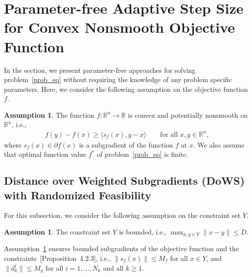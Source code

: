\documentclass{article}
\def\la{\langle}
\def\ra{\rangle}
\def\R{\mathbb{R}}
\theoremstyle{plain}
\theoremstyle{definition}
\newtheorem{assumption}[theorem]{Assumption}
\theoremstyle{remark}
\begin{document}

\section{Parameter-free Adaptive Step Size for Convex Nonsmooth Objective Function}\label{sec:adaptive_step}

In the section, we present parameter-free approaches for solving problem~\eqref{prob_eq} without requiring the knowledge of any problem specific parameters. Here, we consider the following assumption on the objective function $f$.
%
%
\begin{assumption}\label{asum_convex}
    The function $f:\R^n \rightarrow \R$ is convex and potentially nonsmooth on $\R^n$, i.e., 
    \begin{align*}
        f(y)-f(x)\ge \la s_f(x),y-x\ra \qquad \text{for all } x,y\in \R^n ,
    \end{align*}
    where $s_f(x)\in\partial f(x)$ is a subgradient of the function $f$ at $x$. We also assume that optimal function value $f^*$ of problem~\eqref{prob_eq} is finite. 
\end{assumption}


\subsection{Distance over Weighted Subgradients (DoWS) with Randomized Feasibility}\label{subsec_dows}

For this subsection, we consider the following assumption on the constraint set $Y$.
%
%
%
%
\begin{assumption}\label{asum_set2}
    The constraint set $Y$ is bounded, i.e., $\max_{x,y \in Y}\|x-y\| \leq D$.
\end{assumption}
%
%
Assumption~\ref{asum_set2} ensures bounded subgradients of the objective function and the constraints~\cite{bertsekas2003convex}[Proposition~4.2.3], i.e., $\|s_f(x)\| \leq M_f$ for all $x \in Y$, and $\|d_k^i\| \leq M_g$ for all $i = 1, \ldots, N_{k}$ and all $k \geq 1$. 
\end{document}
